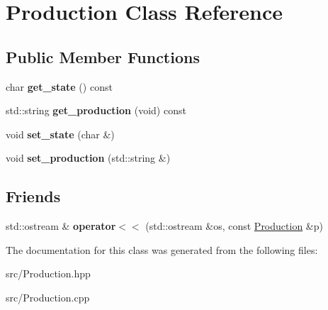 \hypertarget{class_production}{}\section{Production Class Reference}
\label{class_production}
\subsection*{Public Member Functions}
\begin{DoxyCompactItemize}
\item 
\mbox{\label{class_production_aff00b85fabf422326fd1db799573a1c1}} 
char {\bfseries get\+\_\+state} () const
\item 
\mbox{\label{class_production_aab58d10dc1d2f5f9c29f6629d7936f8a}} 
std\+::string {\bfseries get\+\_\+production} (void) const
\item 
\mbox{\label{class_production_a827e3736c647ff5c80551a60b23b6c58}} 
void {\bfseries set\+\_\+state} (char \&)
\item 
\mbox{\label{class_production_a124ec980490dede5dbf4cb307f2ef20f}} 
void {\bfseries set\+\_\+production} (std\+::string \&)
\end{DoxyCompactItemize}
\subsection*{Friends}
\begin{DoxyCompactItemize}
\item 
\mbox{\label{class_production_a91a522f069ea3ed7f496107bef4277ac}} 
std\+::ostream \& {\bfseries operator$<$$<$} (std\+::ostream \&os, const \hyperlink{class_production}{Production} \&p)
\end{DoxyCompactItemize}


The documentation for this class was generated from the following files\+:\begin{DoxyCompactItemize}
\item 
src/Production.\+hpp\item 
src/Production.\+cpp\end{DoxyCompactItemize}
